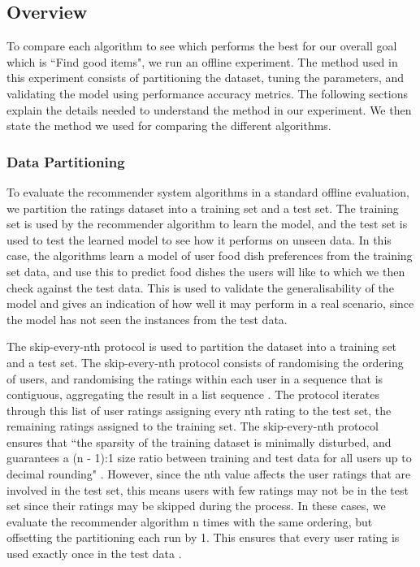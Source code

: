 \subsection{Overview}

To compare each algorithm to see which performs the best for our overall goal which is ``Find good items", we run an offline experiment. The method used in this experiment consists of partitioning the dataset, tuning the parameters, and validating the model using performance accuracy metrics. The following sections explain the details needed to understand the method in our experiment. We then state the method we used for comparing the different algorithms. 

\subsubsection{Data Partitioning}

To evaluate the recommender system algorithms in a standard offline evaluation, we partition the ratings dataset into a training set and a test set. The training set is used by the recommender algorithm to learn the model, and the test set is used to test the learned model to see how it performs on unseen data. In this case, the algorithms learn a model of user food dish preferences from the training set data, and use this to predict food dishes the users will like to which we then check against the test data. This is used to validate the generalisability of the model and gives an indication of how well it may perform in a real scenario, since the model has not seen the instances from the test data.

The skip-every-nth protocol \cite{zhang} is used to partition the dataset into a training set and a test set. The skip-every-nth protocol consists of randomising the ordering of users, and randomising the ratings within each user in a sequence that is contiguous, aggregating the result in a list sequence \cite{zhang}. The protocol iterates through this list of user ratings assigning every nth rating to the test set, the remaining ratings assigned to the training set. The skip-every-nth protocol ensures that ``the sparsity of the training dataset is minimally disturbed, and guarantees a (n - 1):1 size ratio between training and test data for all users up to decimal rounding" \cite{zhang}. However, since the nth value affects the user ratings that are involved in the test set, this means users with few ratings may not be in the test set since their ratings may be skipped during the process. 
 In these cases, we evaluate the recommender algorithm n times with the same ordering, but offsetting the partitioning each run by 1. This ensures that every user rating is used exactly once in the test data \cite{zhang}. 

